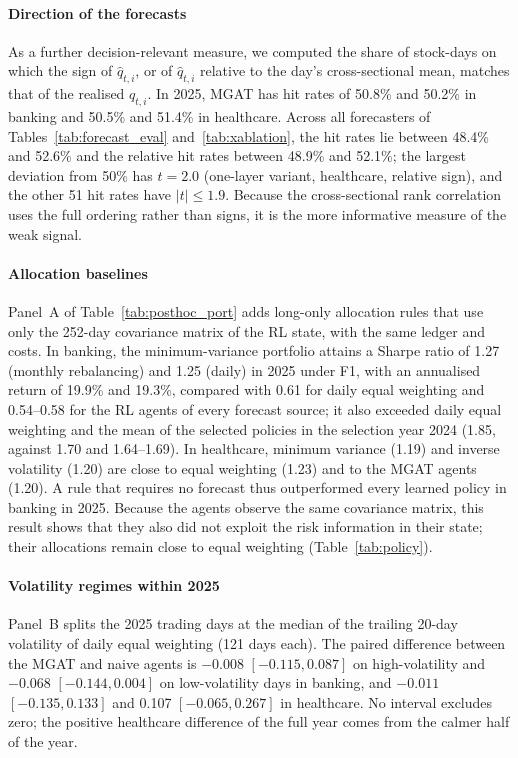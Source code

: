 {\paragraph{Direction of the forecasts}
As a further decision-relevant measure, we computed the share of stock-days on which the sign of $\hat q_{t,i}$, or of $\hat q_{t,i}$ relative to the day's cross-sectional mean, matches that of the realised $q_{t,i}$. In 2025, MGAT has hit rates of 50.8\% and 50.2\% in banking and 50.5\% and 51.4\% in healthcare. Across all forecasters of Tables~\ref{tab:forecast_eval} and~\ref{tab:xablation}, the hit rates lie between 48.4\% and 52.6\% and the relative hit rates between 48.9\% and 52.1\%; the largest deviation from 50\% has $t=2.0$ (one-layer variant, healthcare, relative sign), and the other 51 hit rates have $|t|\le1.9$. Because the cross-sectional rank correlation uses the full ordering rather than signs, it is the more informative measure of the weak signal.

\paragraph{Allocation baselines}
Panel~A of Table~\ref{tab:posthoc_port} adds long-only allocation rules that use only the 252-day covariance matrix of the RL state, with the same ledger and costs. In banking, the minimum-variance portfolio attains a Sharpe ratio of 1.27 (monthly rebalancing) and 1.25 (daily) in 2025 under F1, with an annualised return of 19.9\% and 19.3\%, compared with 0.61 for daily equal weighting and 0.54--0.58 for the RL agents of every forecast source; it also exceeded daily equal weighting and the mean of the selected policies in the selection year 2024 (1.85, against 1.70 and 1.64--1.69). In healthcare, minimum variance (1.19) and inverse volatility (1.20) are close to equal weighting (1.23) and to the MGAT agents (1.20). A rule that requires no forecast thus outperformed every learned policy in banking in 2025. Because the agents observe the same covariance matrix, this result shows that they also did not exploit the risk information in their state; their allocations remain close to equal weighting (Table~\ref{tab:policy}).

\paragraph{Volatility regimes within 2025}
Panel~B splits the 2025 trading days at the median of the trailing 20-day volatility of daily equal weighting (121 days each). The paired difference between the MGAT and naive agents is $-0.008$ $[-0.115, 0.087]$ on high-volatility and $-0.068$ $[-0.144, 0.004]$ on low-volatility days in banking, and $-0.011$ $[-0.135, 0.133]$ and 0.107 $[-0.065, 0.267]$ in healthcare. No interval excludes zero; the positive healthcare difference of the full year comes from the calmer half of the year.

}
